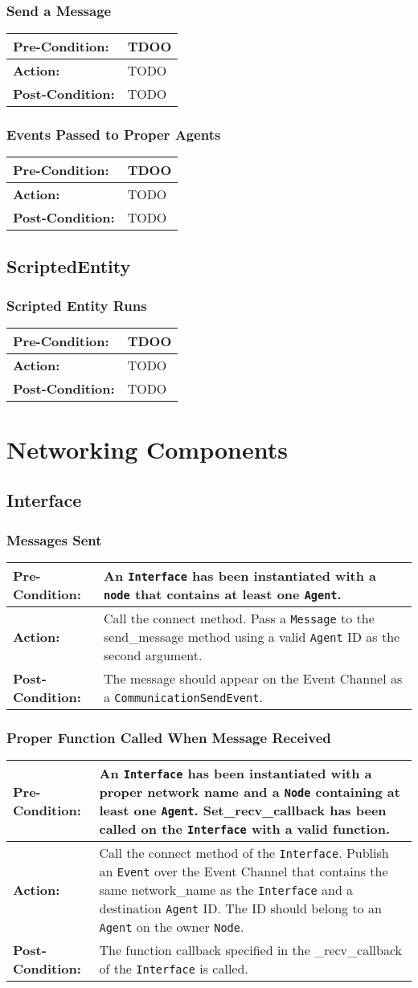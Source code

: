 \documentclass[titlepage]{article}
\newcommand{\testcase}[3]{
    \begin{center}
    \begin{tabular}{| l | p{0.7\textwidth}|}
        \hline
        \rowcolor[gray]{0.8}\textbf{Pre-Condition:} & #1 \\ \hline
        \textbf{Action:} & #2 \\ \hline
        \rowcolor[gray]{0.8}\textbf{Post-Condition:} & #3 \\ \hline
    \end{tabular}
    \end{center}
}
\begin{document}
\subsubsection{Send a Message}
\testcase{TDOO}{TODO}{TODO}

\subsubsection{Events Passed to Proper Agents}
\testcase{TDOO}{TODO}{TODO}

\subsection{ScriptedEntity}
\subsubsection{Scripted Entity Runs}
\testcase{TDOO}{TODO}{TODO}


\section{Networking Components}
\subsection{Interface}
\subsubsection{Messages Sent}
\testcase{An \texttt{Interface} has been instantiated with a \texttt{node} that contains at least one
\texttt{Agent}.}{Call the connect method. Pass a \texttt{Message} to the send\_message method using a valid
\texttt{Agent} ID as the second argument.}{The message should appear on the Event Channel as a
\texttt{CommunicationSendEvent}.}

\subsubsection{Proper Function Called When Message Received}
\testcase{An \texttt{Interface} has been instantiated with a proper network name and a \texttt{Node} containing at least
one \texttt{Agent}. Set\_recv\_callback has been called on the \texttt{Interface} with a valid function.}{Call the connect method of the \texttt{Interface}.  Publish an \texttt{Event} over the Event
Channel that contains the same network\_name as the \texttt{Interface} and a destination \texttt{Agent} ID.  The ID
should belong to an \texttt{Agent} on the owner \texttt{Node}.}{The function callback specified in the \_recv\_callback
of the \texttt{Interface} is called.}
\end{document}

